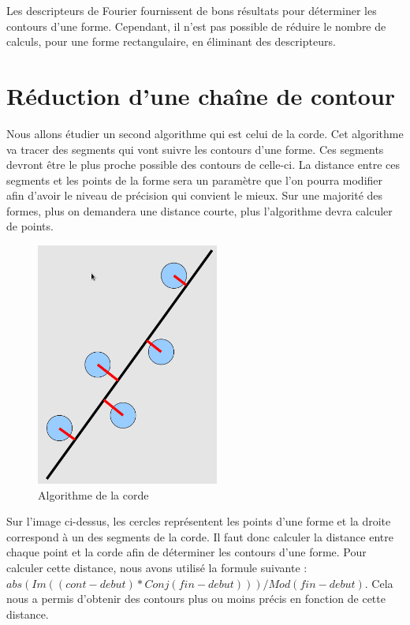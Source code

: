 \documentclass[11pt]{article}
\begin{document}
  Les descripteurs de Fourier fournissent de bons résultats pour déterminer les contours d'une forme. 
  Cependant, il n'est pas possible de réduire le nombre de calculs, pour une forme rectangulaire, 
  en éliminant des descripteurs.

  \section{Réduction d'une chaîne de contour}
  Nous allons étudier un second algorithme qui est celui de la corde.
  Cet algorithme va tracer des segments qui vont suivre les contours d'une forme. Ces segments 
  devront être le plus proche possible des contours de celle-ci. La distance entre ces segments 
  et les points de la forme sera un paramètre que l'on pourra modifier afin d'avoir le niveau de 
  précision qui convient le mieux. Sur une majorité des formes, plus on demandera une distance courte, 
  plus l'algorithme devra calculer de points.\\ 
  
  
  \begin{figure}[!h]
    \begin{center}
      \includegraphics[width=6cm]{corde.png}
    \end{center}
    \caption{Algorithme de la corde}
  \end{figure}
  
  
  Sur l'image ci-dessus, les cercles représentent les points d'une forme et la droite correspond
  à un des segments de la corde. Il faut donc calculer la distance entre chaque point et la corde
  afin de déterminer les contours d'une forme.
  Pour calculer cette distance, nous avons utilisé la formule suivante :
  $abs(Im((cont - debut) * Conj(fin - debut))) / Mod(fin - debut)$.
  Cela nous a permis d'obtenir des contours plus ou moins précis en fonction de cette distance.\\
  
\end{document}
